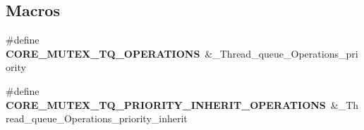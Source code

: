 \subsection*{Macros}
\begin{DoxyCompactItemize}
\item 
\mbox{\label{group__RTEMSScoreMutex_ga996ff26ad1e938f70e6255b6e1688958}} 
\#define {\bfseries C\+O\+R\+E\+\_\+\+M\+U\+T\+E\+X\+\_\+\+T\+Q\+\_\+\+O\+P\+E\+R\+A\+T\+I\+O\+NS}~\&\+\_\+\+Thread\+\_\+queue\+\_\+\+Operations\+\_\+priority
\item 
\mbox{\label{group__RTEMSScoreMutex_gabab3a68a08cbcbe569f91ec7de3e14bc}} 
\#define {\bfseries C\+O\+R\+E\+\_\+\+M\+U\+T\+E\+X\+\_\+\+T\+Q\+\_\+\+P\+R\+I\+O\+R\+I\+T\+Y\+\_\+\+I\+N\+H\+E\+R\+I\+T\+\_\+\+O\+P\+E\+R\+A\+T\+I\+O\+NS}~\&\+\_\+\+Thread\+\_\+queue\+\_\+\+Operations\+\_\+priority\+\_\+inherit
\end{DoxyCompactItemize}
